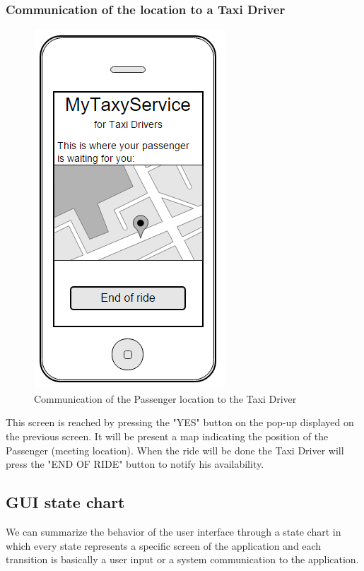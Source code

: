 \subsubsection{Communication of the location to a Taxi Driver}
\begin{figure}[H]
\centering
\includegraphics[scale=0.6]{Images/taxi_driver_busy}
\caption{Communication of the Passenger location to the Taxi Driver}
\end{figure}
This screen is reached by pressing the "YES" button on the pop-up displayed on the previous screen. It will be present a map indicating the position of the Passenger (meeting location). When the ride will be done the Taxi Driver will press the "END OF RIDE" button to notify his availability.


\subsection{GUI state chart}
We can summarize the behavior of the user interface through a state chart in which every state represents a specific screen of the application and each transition is basically a user input or a system communication to the application.
